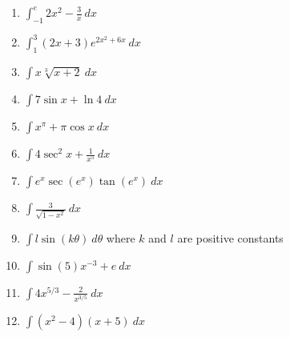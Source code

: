 \documentclass[12pt]{article}
\renewcommand{\emph}[1]{\textsf{\textbf{#1}}}
\newcounter{probcount}
\newcounter{subprobcount}
\newenvironment{subproblems}{%
\begin{enumerate}%
\setcounter{enumi}{\value{subprobcount}}%
\renewcommand{\theenumi}{\emph{\alph{enumi}}}}%
{\setcounter{subprobcount}{\value{enumi}}\end{enumerate}}
\newcommand{\ds}{\displaystyle}
\begin{document}
\begin{subproblems}


\item   $\ds \int_{-1}^{e} 2x^{2}-\frac{3}{x}
\: dx$\\
\vfill %

\item $\ds \int_{1}^{3} (2x+3)e^{2x^{2}+6x}
\: dx$\\
\vfill%

\item   $\ds \int x \sqrt[3]{x+2}
\: dx$ \\
\vfill %

\newpage
\item   $\ds \int 7\sin x + \ln 4
\: dx$\\
\vfill %

\item   $\ds \int x^{\pi}+\pi \cos x
\: dx$
\vfill %

\item   $\ds \int 4\sec^{2}x + \frac{1}{x^{5}}
\: dx$ \\
\vfill %

\newpage
\item   $\ds \int e^{x}\sec(e^{x})\tan(e^{x})
\: dx$
\vfill %

\item   $\ds \int \frac{3}{\sqrt{1-x^{2}}}
\: dx$  %
\\ 
\vfill %

\item   $\ds \int l\sin(k\theta)
\: d\theta$ where $k$ and $l$ are positive constants\\
\vfill %

\newpage\item   $\ds \int \sin(5)x^{-3}+e
\: dx$ \hspace{.1in}  %
 \vfill

\item   $\ds \int 4x^{5/3}-\frac{2}{x^{3/5}}
\: dx$
\vfill %

\item   $\ds \int (x^{2}-4)(x+5)
\: dx$
\vfill %

\end{subproblems}
\end{document}
